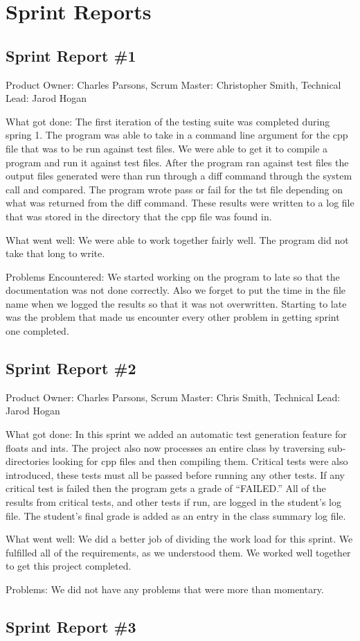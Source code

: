 
\chapter{Sprint Reports}

\section{Sprint Report \#1}

Product Owner: Charles Parsons,
Scrum Master: Christopher Smith,
Technical Lead: Jarod Hogan



What got done:
The first iteration of the testing suite was completed during spring 1. The program was able to take in a command line argument for the cpp file that was to be run against test files. We were able to get it to compile a program and run it against test files. After the program ran against test files the output files generated were than run through a diff command through the system call and compared. The program wrote pass or fail for the tst file depending on what was returned from the diff command. These results were written to a log file that was stored in the directory that the cpp file was found in.

What went well:
We were able to work together fairly well. The program did not take that long to write.

Problems Encountered:
We started working on the program to late so that the documentation was not done correctly. Also we forget to put the time in the file name when we logged the results so that it was not overwritten. Starting to late was the problem that made us encounter every other problem in getting sprint one completed.


\section{Sprint Report \#2}

Product Owner: Charles Parsons,
Scrum Master: Chris Smith,
Technical Lead: Jarod Hogan


What got done:
In this sprint we added an automatic test generation feature for floats and ints. The project also now processes an entire class by traversing sub-directories looking for cpp files and then compiling them. Critical tests were also introduced, these tests must all be passed before running any other tests. If any critical test is failed then the program gets a grade of “FAILED.” All of the results from critical tests, and other tests if run, are logged in the student's log file. The student's final grade is added as an entry in the class summary log file.

What went well:
We did a better job of dividing the work load for this sprint. We fulfilled all of the requirements, as we understood them. We worked well together to get this project completed.

Problems:
We did not have any problems that were more than momentary.

\section{Sprint Report \#3}
